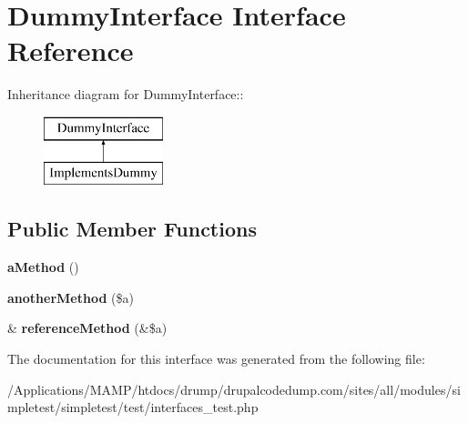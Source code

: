 \hypertarget{interface_dummy_interface}{
\section{DummyInterface Interface Reference}
\label{interface_dummy_interface}
}
Inheritance diagram for DummyInterface::\begin{figure}[H]
\begin{center}
\leavevmode
\includegraphics[height=2cm]{interface_dummy_interface}
\end{center}
\end{figure}
\subsection*{Public Member Functions}
\begin{DoxyCompactItemize}
\item 
\hypertarget{interface_dummy_interface_a5a227393ca6396c96b60f33e246d5819}{
{\bfseries aMethod} ()}
\label{interface_dummy_interface_a5a227393ca6396c96b60f33e246d5819}

\item 
\hypertarget{interface_dummy_interface_a58af2f7ce46c680ab08b654251b18be7}{
{\bfseries anotherMethod} (\$a)}
\label{interface_dummy_interface_a58af2f7ce46c680ab08b654251b18be7}

\item 
\hypertarget{interface_dummy_interface_ae1b52b3adcbe5da0a96f40af44a63a44}{
\& {\bfseries referenceMethod} (\&\$a)}
\label{interface_dummy_interface_ae1b52b3adcbe5da0a96f40af44a63a44}

\end{DoxyCompactItemize}


The documentation for this interface was generated from the following file:\begin{DoxyCompactItemize}
\item 
/Applications/MAMP/htdocs/drump/drupalcodedump.com/sites/all/modules/simpletest/simpletest/test/interfaces\_\-test.php\end{DoxyCompactItemize}
